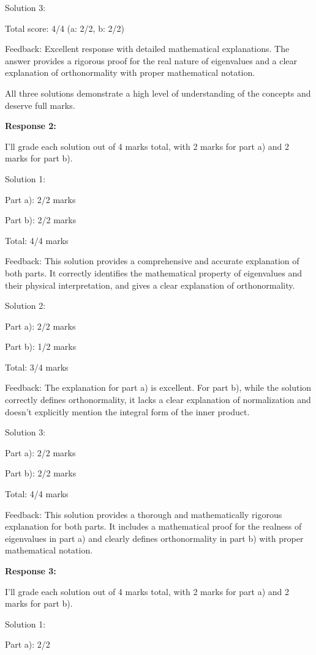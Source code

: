 \documentclass[a4paper,11pt]{article}
\begin{document}
Solution 3:

Total score: 4/4 (a: 2/2, b: 2/2)

Feedback: Excellent response with detailed mathematical explanations. The answer provides a rigorous proof for the real nature of eigenvalues and a clear explanation of orthonormality with proper mathematical notation.

All three solutions demonstrate a high level of understanding of the concepts and deserve full marks.

\bigskip
\textbf{Response 2:}

I'll grade each solution out of 4 marks total, with 2 marks for part a) and 2 marks for part b).

Solution 1:

Part a): 2/2 marks

Part b): 2/2 marks

Total: 4/4 marks

Feedback: This solution provides a comprehensive and accurate explanation of both parts. It correctly identifies the mathematical property of eigenvalues and their physical interpretation, and gives a clear explanation of orthonormality.

Solution 2:

Part a): 2/2 marks

Part b): 1/2 marks

Total: 3/4 marks

Feedback: The explanation for part a) is excellent. For part b), while the solution correctly defines orthonormality, it lacks a clear explanation of normalization and doesn't explicitly mention the integral form of the inner product.

Solution 3:

Part a): 2/2 marks

Part b): 2/2 marks

Total: 4/4 marks

Feedback: This solution provides a thorough and mathematically rigorous explanation for both parts. It includes a mathematical proof for the realness of eigenvalues in part a) and clearly defines orthonormality in part b) with proper mathematical notation.

\bigskip
\textbf{Response 3:}

I'll grade each solution out of 4 marks total, with 2 marks for part a) and 2 marks for part b).

Solution 1:

Part a): 2/2
\end{document}
